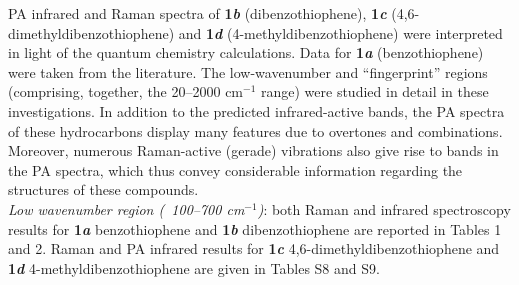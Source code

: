 	
	PA infrared and Raman spectra of \textbf{1\textit{b}} (dibenzothiophene), \textbf{1\textit{c}} (4,6-dimethyldibenzothiophene) and \textbf{1\textit{d}} (4-methyldibenzothiophene) were interpreted in light of the quantum chemistry calculations. Data for \textbf{1\textit{a}} (benzothiophene) were taken from the literature. The low-wavenumber and “fingerprint” regions (comprising, together, the 20–2000 cm$^{-1}$ range) were studied in detail in these investigations. In addition to the predicted infrared-active bands, the PA spectra of these hydrocarbons display many features due to overtones and combinations. Moreover, numerous Raman-active (gerade) vibrations also give rise to bands in the PA spectra, which thus convey considerable information regarding the structures of these compounds.\\
	
	
	\textit{Low wavenumber region (~100–700 cm$^{-1}$)}: both Raman and infrared spectroscopy results for \textbf{1\textit{a}} benzothiophene and \textbf{1\textit{b}} dibenzothiophene are reported in Tables 1 and 2. Raman and PA infrared results for \textbf{1\textit{c}} 4,6-dimethyldibenzothiophene and \textbf{1\textit{d}} 4-methyldibenzothiophene are given in Tables S8 and S9.\\
	
